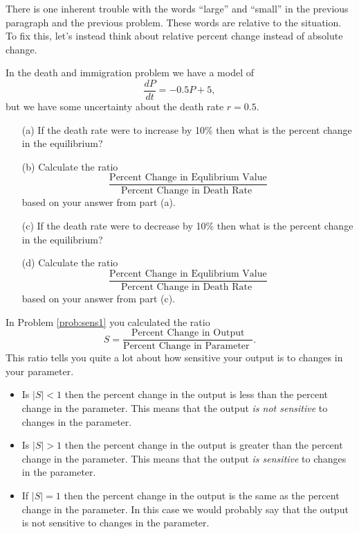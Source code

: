 There is one inherent trouble with the words ``large'' and ``small'' in the previous
paragraph and the previous problem.  These words are relative to the situation.  To fix
this, let's instead think about relative percent change instead of absolute change.

\begin{problem}\label{prob:sens1}
    In the death and immigration problem we have a model of 
    \[ \frac{dP}{dt} = -0.5 P + 5, \]
    but we have some uncertainty about the death rate $r = 0.5$.  
    \begin{enumerate}
        \item[(a)] If the death rate were to increase by 10\% then what is the percent
            change in the equilibrium?  
        \item[(b)] Calculate the ratio
            \[ \frac{\text{Percent Change in Equlibrium Value}}{\text{Percent Change in
            Death Rate } } \]
            based on your answer from part (a).  
        \item[(c)] If the death rate were to decrease by 10\% then what is the percent
            change in the equilibrium?
        \item[(d)] Calculate the ratio
            \[ \frac{\text{Percent Change in Equlibrium Value}}{\text{Percent Change in
            Death Rate } } \]
            based on your answer from part (c).  
    \end{enumerate}
\end{problem}

In Problem \ref{prob:sens1} you calculated the ratio
\[ S = \frac{\text{Percent Change in Output}}{\text{Percent Change in
Parameter } }. \]
This ratio tells you quite a lot about how sensitive your output is to changes in your
parameter.  
\begin{itemize}
    \item Is $|S| < 1$ then the percent change in the output is less than the percent change
        in the parameter.  This means that the output {\it is not sensitive} to changes in
        the parameter.
    \item Is $|S| > 1$ then the percent change in the output is greater than the percent change
        in the parameter.  This means that the output {\it is sensitive} to changes in
        the parameter.
    \item If $|S|= 1$ then the percent change in the output is the same as the percent
        change in the parameter.  In this case we would probably say that the output is
        not sensitive to changes in the parameter.  
\end{itemize}


